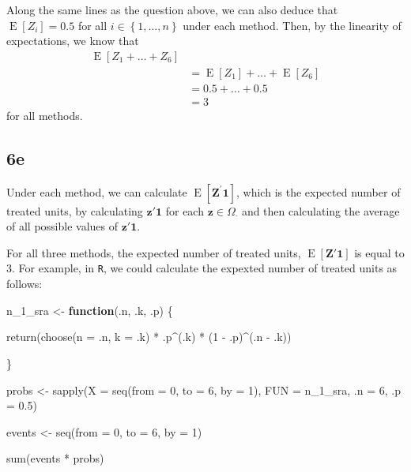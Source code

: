 \documentclass[
  12pt,
  leqno]{article}
\newenvironment{Shaded}{\begin{snugshade}}{\end{snugshade}}
\newcommand{\AttributeTok}[1]{\textcolor[rgb]{0.77,0.63,0.00}{#1}}
\newcommand{\ControlFlowTok}[1]{\textcolor[rgb]{0.13,0.29,0.53}{\textbf{#1}}}
\newcommand{\DecValTok}[1]{\textcolor[rgb]{0.00,0.00,0.81}{#1}}
\newcommand{\FloatTok}[1]{\textcolor[rgb]{0.00,0.00,0.81}{#1}}
\newcommand{\FunctionTok}[1]{\textcolor[rgb]{0.00,0.00,0.00}{#1}}
\newcommand{\NormalTok}[1]{#1}
\newcommand{\OtherTok}[1]{\textcolor[rgb]{0.56,0.35,0.01}{#1}}
\newcommand{\SpecialCharTok}[1]{\textcolor[rgb]{0.00,0.00,0.00}{#1}}
\DeclareMathOperator{\E}{\mathrm{E}}
\DeclareMathOperator{\1}{\mathbbm{1}}
\begin{document}
Along the same lines as the question above, we can also deduce that
\(\E\left[Z_i\right] = 0.5\) for all
\(i \in \left\{1, \dots , n\right\}\) under each method. Then, by the
linearity of expectations, we know that \begin{align*}
\E\left[Z_1 + \dots + Z_6\right] \\
& = \E\left[Z_1\right] + \dots + \E\left[Z_6\right] \\
& = 0.5 + \dots + 0.5 \\
& = 3
\end{align*} for all methods.

\subsection*{6e}

Under each method, we can calculate
\(\E\left[\mathbf{Z}^{\prime}\mathbf{1}\right]\), which is the expected
number of treated units, by calculating \(\mathbf{z}'\mathbf{1}\) for
each \(\mathbf{z} \in \Omega_{\cdot}\) and then calculating the average
of all possible values of \(\mathbf{z}'\mathbf{1}\).

For all three methods, the expected number of treated units,
\(\E\left[\mathbf{Z}'\mathbf{1}\right]\) is equal to \(3\). For example,
in \texttt{R}, we could calculate the expexted number of treated units
as follows:

\scriptsize

\begin{Shaded}
\begin{Highlighting}[]
\NormalTok{n\_1\_sra }\OtherTok{\textless{}{-}} \ControlFlowTok{function}\NormalTok{(.n, .k, .p) \{}

    \FunctionTok{return}\NormalTok{(}\FunctionTok{choose}\NormalTok{(}\AttributeTok{n =}\NormalTok{ .n, }\AttributeTok{k =}\NormalTok{ .k) }\SpecialCharTok{*}\NormalTok{ .p}\SpecialCharTok{\^{}}\NormalTok{(.k) }\SpecialCharTok{*}\NormalTok{ (}\DecValTok{1} \SpecialCharTok{{-}}\NormalTok{ .p)}\SpecialCharTok{\^{}}\NormalTok{(.n }\SpecialCharTok{{-}}\NormalTok{ .k))}

\NormalTok{\}}

\NormalTok{probs }\OtherTok{\textless{}{-}} \FunctionTok{sapply}\NormalTok{(}\AttributeTok{X =} \FunctionTok{seq}\NormalTok{(}\AttributeTok{from =} \DecValTok{0}\NormalTok{, }\AttributeTok{to =} \DecValTok{6}\NormalTok{, }\AttributeTok{by =} \DecValTok{1}\NormalTok{), }\AttributeTok{FUN =}\NormalTok{ n\_1\_sra, }\AttributeTok{.n =} \DecValTok{6}\NormalTok{, }\AttributeTok{.p =} \FloatTok{0.5}\NormalTok{)}


\NormalTok{events }\OtherTok{\textless{}{-}} \FunctionTok{seq}\NormalTok{(}\AttributeTok{from =} \DecValTok{0}\NormalTok{, }\AttributeTok{to =} \DecValTok{6}\NormalTok{, }\AttributeTok{by =} \DecValTok{1}\NormalTok{)}

\FunctionTok{sum}\NormalTok{(events }\SpecialCharTok{*}\NormalTok{ probs)}
\end{Highlighting}
\end{Shaded}
\end{document}
